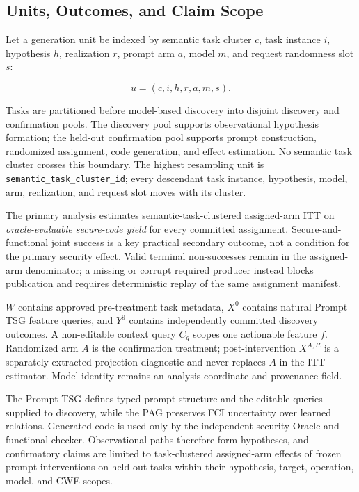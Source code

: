 \documentclass[acmsmall,screen,review,anonymous]{acmart}
\newcommand{\prompttsg}{Prompt TSG\xspace}
\begin{document}
\subsection{Units, Outcomes, and Claim Scope}

Let a generation unit be indexed by semantic task cluster $c$, task instance
$i$, hypothesis $h$, realization $r$, prompt arm $a$, model $m$, and request
randomness slot $s$:

\[
  u = (c,i,h,r,a,m,s).
\]

Tasks are partitioned before model-based discovery into disjoint discovery and
confirmation pools. The discovery pool supports observational hypothesis
formation; the held-out confirmation pool supports prompt construction,
randomized assignment, code generation, and effect estimation. No semantic
task cluster crosses this boundary. The highest resampling unit is
\texttt{semantic\_task\_cluster\_id}; every descendant task instance,
hypothesis, model, arm, realization, and request slot moves with its cluster.

The primary analysis estimates semantic-task-clustered assigned-arm ITT on
\emph{oracle-evaluable secure-code yield} for every committed assignment.
Secure-and-functional joint success is a key practical secondary outcome, not
a condition for the primary security effect. Valid terminal non-successes
remain in the assigned-arm denominator; a missing or corrupt required producer
instead blocks publication and requires deterministic replay of the same
assignment manifest.

$W$ contains approved pre-treatment task metadata, $X^0$ contains natural
Prompt TSG feature queries, and $Y^0$ contains independently committed
discovery outcomes. A non-editable context query $C_q$ scopes one actionable
feature $f$. Randomized arm $A$ is the confirmation treatment;
post-intervention $X^{A,R}$ is a separately extracted projection diagnostic
and never replaces $A$ in the ITT estimator. Model identity remains an analysis
coordinate and provenance field.

The \prompttsg defines typed prompt structure and the editable queries supplied
to discovery, while the PAG preserves FCI uncertainty over learned relations.
Generated code is used only by the independent security Oracle and functional
checker. Observational paths therefore form hypotheses, and confirmatory claims
are limited to task-clustered assigned-arm effects of frozen prompt
interventions on held-out tasks within their hypothesis, target, operation,
model, and CWE scopes.
\end{document}
